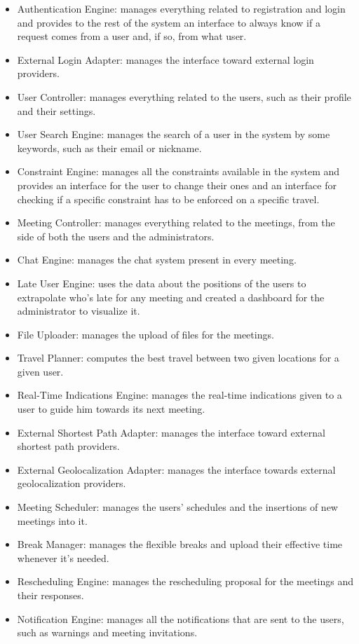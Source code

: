 \begin{itemize}
\item Authentication Engine: manages everything related to registration and login and provides to the rest of the system an interface to always know if a request comes from a user and, if so, from what user.
\item External Login Adapter: manages the interface toward external login providers.
\item User Controller: manages everything related to the users, such as their profile and their settings.
\item User Search Engine: manages the search of a user in the system by some keywords, such as their email or nickname.
\item Constraint Engine: manages all the constraints available in the system and provides an interface for the user to change their ones and an interface for checking if a specific constraint has to be enforced on a specific travel.
\item Meeting Controller: manages everything related to the meetings, from the side of both the users and the administrators.
\item Chat Engine: manages the chat system present in every meeting.
\item Late User Engine: uses the data about the positions of the users to extrapolate who's late for any meeting and created a dashboard for the administrator to visualize it.
\item File Uploader: manages the upload of files for the meetings.
\item Travel Planner: computes the best travel between two given locations for a given user.
\item Real-Time Indications Engine: manages the real-time indications given to a user to guide him towards its next meeting.
\item External Shortest Path Adapter: manages the interface toward external shortest path providers.
\item External Geolocalization Adapter: manages the interface towards external geolocalization providers.
\item Meeting Scheduler: manages the users' schedules and the insertions of new meetings into it.
\item Break Manager: manages the flexible breaks and upload their effective time whenever it's needed.
\item Rescheduling Engine: manages the rescheduling proposal for the meetings and their responses.
\item Notification Engine: manages all the notifications that are sent to the users, such as warnings and meeting invitations.
\end{itemize}